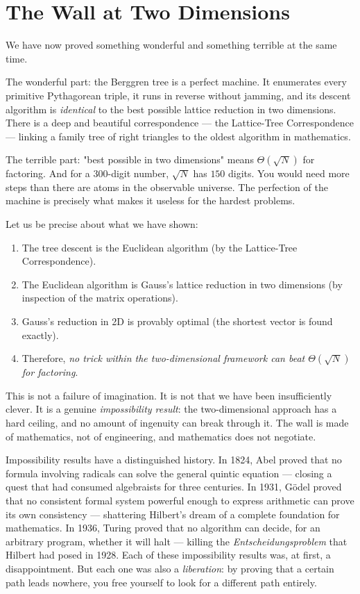 \documentclass[11pt,twoside,openright]{book}
\theoremstyle{definition}
\theoremstyle{remark}
\begin{document}
\section{The Wall at Two Dimensions}

We have now proved something wonderful and something terrible at the same time.

The wonderful part: the Berggren tree is a perfect machine. It enumerates every primitive Pythagorean triple, it runs in reverse without jamming, and its descent algorithm is \textit{identical} to the best possible lattice reduction in two dimensions. There is a deep and beautiful correspondence --- the Lattice-Tree Correspondence --- linking a family tree of right triangles to the oldest algorithm in mathematics.

The terrible part: "best possible in two dimensions" means $\Theta(\sqrt{N})$ for factoring. And for a $300$-digit number, $\sqrt{N}$ has $150$ digits. You would need more steps than there are atoms in the observable universe. The perfection of the machine is precisely what makes it useless for the hardest problems.

Let us be precise about what we have shown:

\begin{enumerate}
  \item The tree descent is the Euclidean algorithm (by the Lattice-Tree Correspondence).
  \item The Euclidean algorithm is Gauss's lattice reduction in two dimensions (by inspection of the matrix operations).
  \item Gauss's reduction in 2D is provably optimal (the shortest vector is found exactly).
  \item Therefore, \textit{no trick within the two-dimensional framework can beat $\Theta(\sqrt{N})$ for factoring}.
\end{enumerate}

This is not a failure of imagination. It is not that we have been insufficiently clever. It is a genuine \textit{impossibility result}: the two-dimensional approach has a hard ceiling, and no amount of ingenuity can break through it. The wall is made of mathematics, not of engineering, and mathematics does not negotiate.


Impossibility results have a distinguished history. In 1824, Abel proved that no formula involving radicals can solve the general quintic equation --- closing a quest that had consumed algebraists for three centuries. In 1931, G\"odel proved that no consistent formal system powerful enough to express arithmetic can prove its own consistency --- shattering Hilbert's dream of a complete foundation for mathematics. In 1936, Turing proved that no algorithm can decide, for an arbitrary program, whether it will halt --- killing the \textit{Entscheidungsproblem} that Hilbert had posed in 1928. Each of these impossibility results was, at first, a disappointment. But each one was also a \textit{liberation}: by proving that a certain path leads nowhere, you free yourself to look for a different path entirely.
\end{document}
